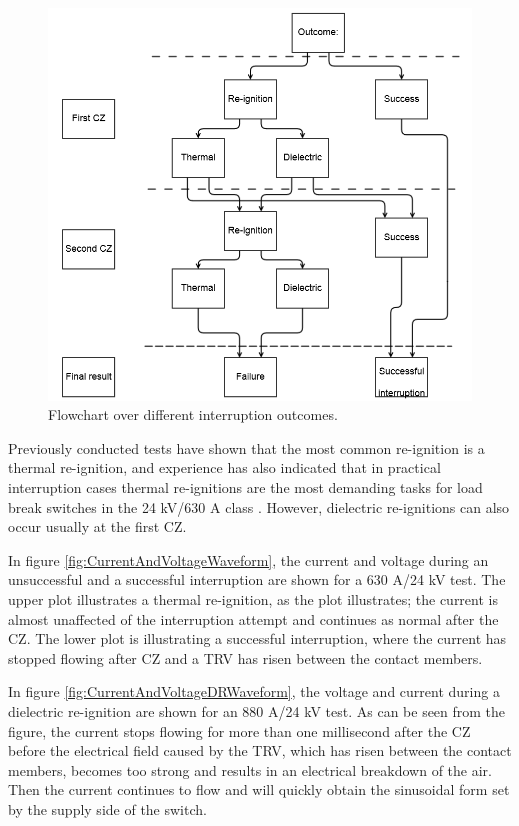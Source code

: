 \documentclass[10pt,b5paper,twoside]{article}
\begin{document}
\begin{figure} [H]
\centering
\includegraphics[scale=0.6]{Bilder/Results/outcomeinterruption.png}
\caption{Flowchart over different interruption outcomes.} \label{fig:flowchart}
\end{figure}

Previously conducted tests have shown that the most common re-ignition is a thermal re-ignition, and experience has also indicated that in practical interruption cases thermal re-ignitions are the most demanding tasks for load break switches in the 24 kV/630 A class \cite{bib:AFIMVLBA}. However, dielectric re-ignitions can also occur usually at the first CZ.

In figure \ref{fig:CurrentAndVoltageWaveform}, the current and voltage during an unsuccessful and a successful interruption are shown for a 630 A/24 kV test. The upper plot illustrates a thermal re-ignition, as the plot illustrates; the current is almost unaffected of the interruption attempt and continues as normal after the CZ. The lower plot is illustrating a successful interruption, where the current has stopped flowing after CZ and a TRV has risen between the contact members. 

In figure \ref{fig:CurrentAndVoltageDRWaveform}, the voltage and current during a dielectric re-ignition are shown for an 880 A/24 kV test. As can be seen from the figure, the current stops flowing for more than one millisecond after the CZ before the electrical field caused by the TRV, which has risen between the contact members, becomes too strong and results in an electrical breakdown of the air. Then the current continues to flow and will quickly obtain the sinusoidal form set by the supply side of the switch. 
\end{document}
